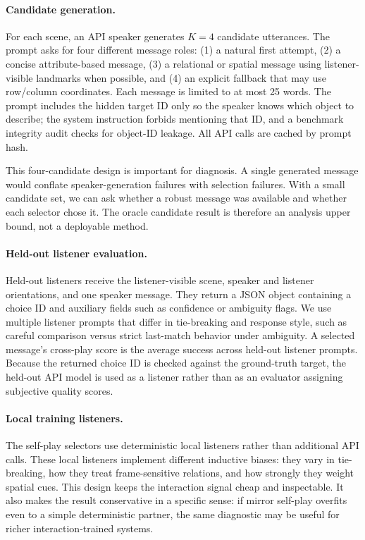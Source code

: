 \documentclass[10pt]{article}
\begin{document}
\paragraph{Candidate generation.}
For each scene, an API speaker generates $K=4$ candidate utterances. The prompt asks for four different message roles: (1) a natural first attempt, (2) a concise attribute-based message, (3) a relational or spatial message using listener-visible landmarks when possible, and (4) an explicit fallback that may use row/column coordinates. Each message is limited to at most 25 words. The prompt includes the hidden target ID only so the speaker knows which object to describe; the system instruction forbids mentioning that ID, and a benchmark integrity audit checks for object-ID leakage. All API calls are cached by prompt hash.

This four-candidate design is important for diagnosis. A single generated message would conflate speaker-generation failures with selection failures. With a small candidate set, we can ask whether a robust message was available and whether each selector chose it. The oracle candidate result is therefore an analysis upper bound, not a deployable method.

\paragraph{Held-out listener evaluation.}
Held-out listeners receive the listener-visible scene, speaker and listener orientations, and one speaker message. They return a JSON object containing a choice ID and auxiliary fields such as confidence or ambiguity flags. We use multiple listener prompts that differ in tie-breaking and response style, such as careful comparison versus strict last-match behavior under ambiguity. A selected message's cross-play score is the average success across held-out listener prompts. Because the returned choice ID is checked against the ground-truth target, the held-out API model is used as a listener rather than as an evaluator assigning subjective quality scores.

\paragraph{Local training listeners.}
The self-play selectors use deterministic local listeners rather than additional API calls. These local listeners implement different inductive biases: they vary in tie-breaking, how they treat frame-sensitive relations, and how strongly they weight spatial cues. This design keeps the interaction signal cheap and inspectable. It also makes the result conservative in a specific sense: if mirror self-play overfits even to a simple deterministic partner, the same diagnostic may be useful for richer interaction-trained systems.
\end{document}
